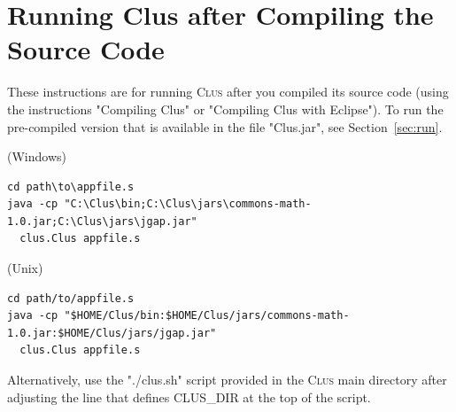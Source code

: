 \documentclass[a4paper]{report}
\newcommand{\clus}{\textsc{Clus}}
\begin{document}
\section{Running Clus after Compiling the Source Code}

These instructions are for running \clus{} after you compiled its source code (using the instructions "Compiling Clus" or "Compiling Clus with Eclipse"). To run the pre-compiled version that is available in the file "Clus.jar", see Section~\ref{sec:run}.

\vspace*{1em}\noindent(Windows)
\begin{small}
\begin{verbatim}
cd path\to\appfile.s
java -cp "C:\Clus\bin;C:\Clus\jars\commons-math-1.0.jar;C:\Clus\jars\jgap.jar" 
  clus.Clus appfile.s
\end{verbatim}
\end{small}

\noindent(Unix)

\begin{small}
\begin{verbatim}
cd path/to/appfile.s
java -cp "$HOME/Clus/bin:$HOME/Clus/jars/commons-math-1.0.jar:$HOME/Clus/jars/jgap.jar" 
  clus.Clus appfile.s
\end{verbatim}
\end{small}
%
Alternatively, use the "./clus.sh" script provided in the \clus{} main directory after adjusting the line that defines CLUS\_DIR at the top of the script.
\end{document}
